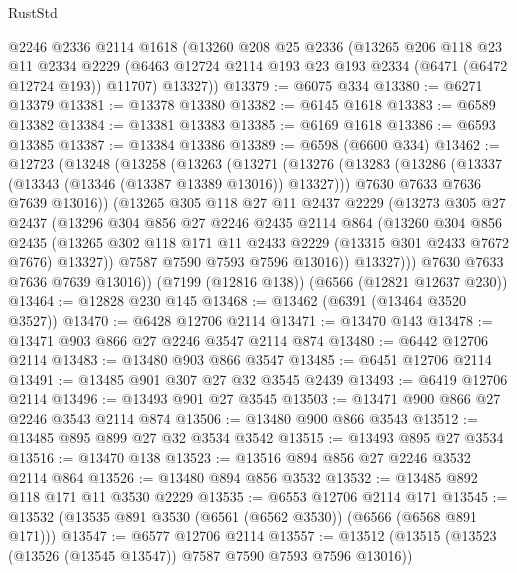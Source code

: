 \begin{lexlean}{RustStd}
\begin{coremodule}
{\begin{coremodule}
{{{{{{{{{{{{{{{{{{{{{{{{{{    @2246
    @2336
    @2114
    @1618
    (@13260
      @208
      @25
      @2336
      (@13265
        @206
        @118
        @23
        @11
        @2334
        @2229
        (@6463 @12724 @2114 @193 @23 @193 @2334 (@6471 (@6472 @12724 @193)) @11707)
        @13327))
@13379 := @6075 @334
@13380 := @6271 @13379
@13381 := @13378 @13380
@13382 := @6145 @1618
@13383 := @6589 @13382
@13384 := @13381 @13383
@13385 := @6169 @1618
@13386 := @6593 @13385
@13387 := @13384 @13386
@13389 := @6598 (@6600 @334)
@13462 := @12723
    (@13248
      (@13258
        (@13263
          (@13271
            (@13276
              (@13283
                (@13286 (@13337 (@13343 (@13346 (@13387 @13389 @13016)) @13327)))
                @7630
                @7633
                @7636
                @7639
                @13016))
            (@13265
              @305
              @118
              @27
              @11
              @2437
              @2229
              (@13273
                @305
                @27
                @2437
                (@13296
                  @304
                  @856
                  @27
                  @2246
                  @2435
                  @2114
                  @864
                  (@13260
                    @304
                    @856
                    @2435
                    (@13265 @302 @118 @171 @11 @2433 @2229 (@13315 @301 @2433 @7672 @7676) @13327))
                  @7587
                  @7590
                  @7593
                  @7596
                  @13016))
              @13327)))
        @7630
        @7633
        @7636
        @7639
        @13016))
    (@7199 (@12816 @138))
    (@6566 (@12821 @12637 @230))
@13464 := @12828 @230 @145
@13468 := @13462 (@6391 (@13464 @3520 @3527))
@13470 := @6428 @12706 @2114
@13471 := @13470 @143
@13478 := @13471 @903 @866 @27 @2246 @3547 @2114 @874
@13480 := @6442 @12706 @2114
@13483 := @13480 @903 @866 @3547
@13485 := @6451 @12706 @2114
@13491 := @13485 @901 @307 @27 @32 @3545 @2439
@13493 := @6419 @12706 @2114
@13496 := @13493 @901 @27 @3545
@13503 := @13471 @900 @866 @27 @2246 @3543 @2114 @874
@13506 := @13480 @900 @866 @3543
@13512 := @13485 @895 @899 @27 @32 @3534 @3542
@13515 := @13493 @895 @27 @3534
@13516 := @13470 @138
@13523 := @13516 @894 @856 @27 @2246 @3532 @2114 @864
@13526 := @13480 @894 @856 @3532
@13532 := @13485 @892 @118 @171 @11 @3530 @2229
@13535 := @6553 @12706 @2114 @171
@13545 := @13532 (@13535 @891 @3530 (@6561 (@6562 @3530)) (@6566 (@6568 @891 @171)))
@13547 := @6577 @12706 @2114
@13557 := @13512 (@13515 (@13523 (@13526 (@13545 @13547)) @7587 @7590 @7593 @7596 @13016))
}}}}}}}}}}}}}}}}}}}}}}}}}}
\end{coremodule}}
\end{coremodule}
\end{lexlean}
